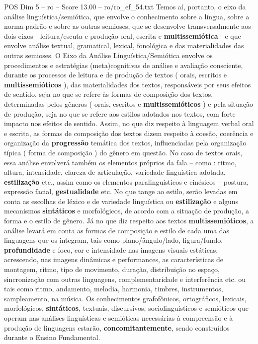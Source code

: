\begin{textsample}{POS Dim 5 – ro – Score 13.00 – ro/ro\_ef\_54.txt}
Temos aí, portanto, o eixo da análise linguística/semiótica, que envolve o conhecimento sobre a língua, sobre a norma-padrão e sobre as outras semioses, que se desenvolve transversalmente aos dois eixos - leitura/escuta e produção oral, escrita e \textbf{multissemiótica} - e que envolve análise textual, gramatical, lexical, fonológica e das materialidades das outras semioses.
O Eixo da Análise Linguística/Semiótica envolve os procedimentos e estratégias (meta)cognitivas de análise e avaliação consciente, durante os processos de leitura e de produção de textos ( orais, escritos e \textbf{multissemióticos} ), das materialidades dos textos, responsáveis por seus efeitos de sentido, seja no que se refere às formas de composição dos textos, determinadas pelos gêneros ( orais, escritos e \textbf{multissemióticos} ) e pela situação de produção, seja no que se refere aos estilos adotados nos textos, com forte impacto nos efeitos de sentido.
Assim, no que diz respeito à linguagem verbal oral e escrita, as formas de composição dos textos dizem respeito à coesão, coerência e organização da \textbf{progressão} temática dos textos, influenciadas pela organização típica ( forma de composição ) do gênero em questão.
No caso de textos orais, essa análise envolverá também os elementos próprios da fala – como : ritmo, altura, intensidade, clareza de articulação, variedade linguística adotada, \textbf{estilização} etc., assim como os elementos paralinguísticos e cinésicos – postura, expressão facial, \textbf{gestualidade} etc.
No que tange ao estilo, serão levadas em conta as escolhas de léxico e de variedade linguística ou \textbf{estilização} e alguns mecanismos \textbf{sintáticos} e morfológicos, de acordo com a situação de produção, a forma e o estilo de gênero.
Já no que diz respeito aos textos \textbf{multissemióticos}, a análise levará em conta as formas de composição e estilo de cada uma das linguagens que os integram, tais como plano/ângulo/lado, figura/fundo, \textbf{profundidade} e foco, cor e intensidade nas imagens visuais estáticas, acrescendo, nas imagens dinâmicas e performances, as características de montagem, ritmo, tipo de movimento, duração, distribuição no espaço, sincronização com outras linguagens, complementaridade e interferência etc. ou tais como ritmo, andamento, melodia, harmonia, timbres, instrumentos, sampleamento, na música.
Os conhecimentos grafofônicos, ortográficos, lexicais, morfológicos, \textbf{sintáticos}, textuais, discursivos, sociolinguísticos e semióticos que operam nas análises linguísticas e semióticas necessárias à compreensão e à produção de linguagens estarão, \textbf{concomitantemente}, sendo construídos durante o Ensino Fundamental.

\end{textsample}

